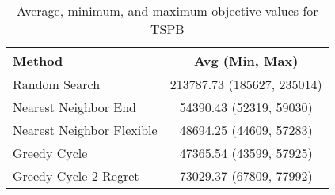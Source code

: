 \begin{table}[h!]
\centering
\begin{tabular}{lc}
\hline
Method & Avg (Min, Max) \\
\hline
Random Search & 213787.73 (185627, 235014) \\
Nearest Neighbor End & 54390.43 (52319, 59030) \\
Nearest Neighbor Flexible & 48694.25 (44609, 57283) \\
Greedy Cycle & 47365.54 (43599, 57925) \\
Greedy Cycle 2-Regret & 73029.37 (67809, 77992) \\
\hline
\end{tabular}
\caption{Average, minimum, and maximum objective values for TSPB}
\label{tab:TSPB_results}
\end{table}
